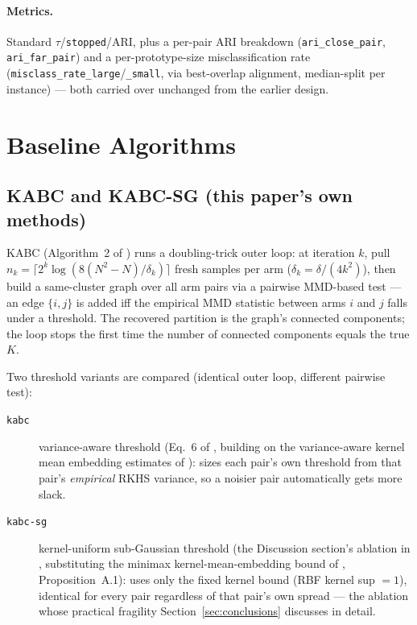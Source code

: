 \documentclass[11pt]{article}
\begin{document}
\paragraph{Metrics.} Standard $\tau$/\texttt{stopped}/ARI, plus a per-pair
ARI breakdown (\texttt{ari\_close\_pair}, \texttt{ari\_far\_pair}) and a
per-prototype-size misclassification rate
(\texttt{misclass\_rate\_large}/\texttt{\_small}, via best-overlap
alignment, median-split per instance) --- both carried over unchanged from
the earlier design.

\FloatBarrier
\section{Baseline Algorithms}
\label{sec:baselines}

\subsection{KABC and KABC-SG (this paper's own methods)}

KABC (Algorithm~2 of \cite{kabc2026}) runs a doubling-trick outer loop: at
iteration $k$, pull $n_k = \lceil 2^k \log(8(N^2-N)/\delta_k)\rceil$ fresh samples
per arm ($\delta_k = \delta/(4k^2)$), then build a same-cluster graph over all arm
pairs via a pairwise MMD-based test --- an edge $\{i,j\}$ is added iff the
empirical MMD statistic between arms $i$ and $j$ falls under a threshold. The
recovered partition is the graph's connected components; the loop stops the
first time the number of connected components equals the true $K$.

Two threshold variants are compared (identical outer loop, different pairwise
test):
\begin{description}
  \item[\texttt{kabc}] variance-aware threshold (Eq.~6 of \cite{kabc2026},
    building on the variance-aware kernel mean embedding estimates of
    \cite{wolferalquier2025}): sizes each pair's own threshold from that
    pair's \emph{empirical} RKHS variance, so a noisier pair automatically
    gets more slack.
  \item[\texttt{kabc-sg}] kernel-uniform sub-Gaussian threshold (the
    Discussion section's ablation in \cite{kabc2026}, substituting the
    minimax kernel-mean-embedding bound of \cite{tolstikhin2017},
    Proposition~A.1): uses only the fixed kernel bound (RBF kernel sup
    $=1$), identical for every pair regardless of that pair's own spread ---
    the ablation whose practical fragility Section~\ref{sec:conclusions}
    discusses in detail.
\end{description}
\end{document}
